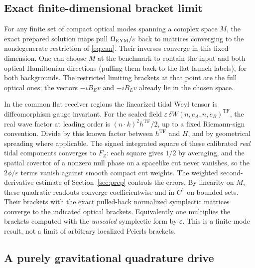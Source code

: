 \documentclass[11pt]{article}
\newcommand{\eps}{\varepsilon}
\newcommand{\TF}{\mathrm{TF}}
\begin{document}
\subsection{Exact finite-dimensional bracket limit}

For any finite set of compact optical modes spanning a
complex space \(M\), the exact prepared solution maps
pull \(\Omega_{\rm EYM}/\eps\) back to matrices converging
to the nondegenerate restriction of \eqref{eq:can}.
Their inverses converge in this fixed dimension.
One can choose \(M\) at the benchmark to contain the
input and both optical Hamiltonian directions (pulling
them back to the flat launch labels), for both backgrounds.
The restricted limiting brackets at that point are the
full optical ones; the vectors \(-iB_E v\) and
\(-iB_Lv\) already lie in the chosen space.

In the common flat receiver regions the linearized
tidal Weyl tensor is diffeomorphism gauge invariant.
For the scaled field \(\eps\,\delta W(n,e_A,n,e_B)^\TF\),
the real wave factor at leading order is
\((n\cdot k)^2h^\TF/2\), up to a fixed Riemann-sign
convention. Divide by this known factor between \(h^\TF\)
and \(H\), and by geometrical spreading where applicable.
The signed integrated square of these calibrated
\emph{real} tidal components converges to \(F_Z\):
each square gives \(1/2\) by averaging, and the spatial
covector of a nonzero null phase on a spacelike cut
never vanishes, so the \(2\phi/\eps\) terms vanish
against smooth compact cut weights. The weighted
second-derivative estimate of Section~\ref{sec:prep}
controls the errors. By linearity on \(M\), these
quadratic readouts converge coefficientwise and in \(C^1\)
on bounded sets. Their brackets with the exact pulled-back
normalized symplectic matrices converge to the indicated
optical brackets. Equivalently one multiplies the
brackets computed with the \emph{unscaled} symplectic
form by \(\eps\). This is a finite-mode result, not a
limit of arbitrary localized Peierls brackets.

\subsection{A purely gravitational quadrature drive}
\end{document}
